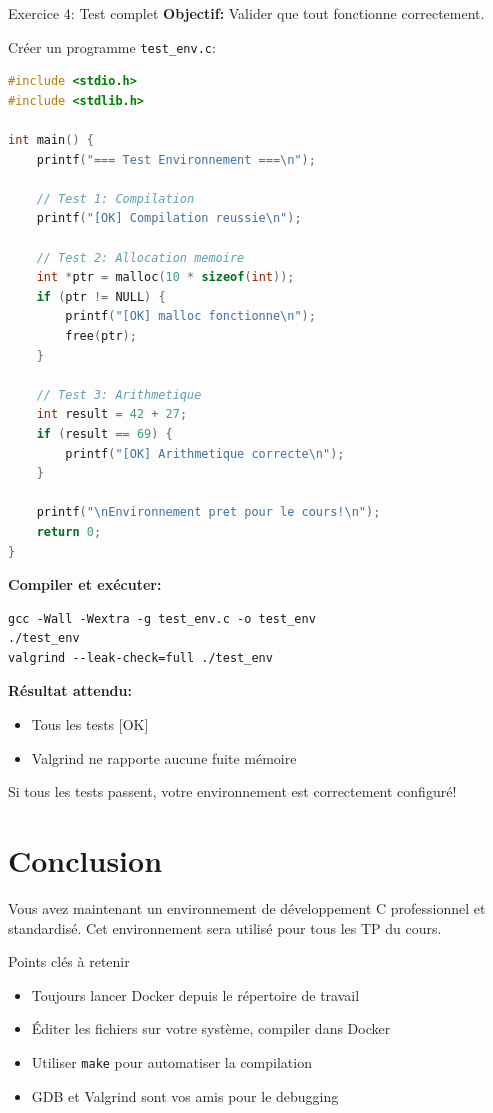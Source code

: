 \documentclass[10pt,a4paper]{article}
\begin{document}
\begin{exercicebox}{Exercice 4: Test complet}
\textbf{Objectif:} Valider que tout fonctionne correctement.

Créer un programme \texttt{test\_env.c}:
\begin{lstlisting}[language=C]
#include <stdio.h>
#include <stdlib.h>

int main() {
    printf("=== Test Environnement ===\n");
    
    // Test 1: Compilation
    printf("[OK] Compilation reussie\n");
    
    // Test 2: Allocation memoire
    int *ptr = malloc(10 * sizeof(int));
    if (ptr != NULL) {
        printf("[OK] malloc fonctionne\n");
        free(ptr);
    }
    
    // Test 3: Arithmetique
    int result = 42 + 27;
    if (result == 69) {
        printf("[OK] Arithmetique correcte\n");
    }
    
    printf("\nEnvironnement pret pour le cours!\n");
    return 0;
}
\end{lstlisting}

\textbf{Compiler et exécuter:}
\begin{verbatim}
gcc -Wall -Wextra -g test_env.c -o test_env
./test_env
valgrind --leak-check=full ./test_env
\end{verbatim}

\textbf{Résultat attendu:}
\begin{itemize}
\item Tous les tests [OK]
\item Valgrind ne rapporte aucune fuite mémoire
\end{itemize}

Si tous les tests passent, votre environnement est correctement configuré!
\end{exercicebox}

\section*{Conclusion}

Vous avez maintenant un environnement de développement C professionnel et standardisé. Cet environnement sera utilisé pour tous les TP du cours.

\begin{infobox}{Points clés à retenir}
\begin{itemize}
\item Toujours lancer Docker depuis le répertoire de travail
\item Éditer les fichiers sur votre système, compiler dans Docker
\item Utiliser \texttt{make} pour automatiser la compilation
\item GDB et Valgrind sont vos amis pour le debugging
\end{itemize}
\end{infobox}
\end{document}
